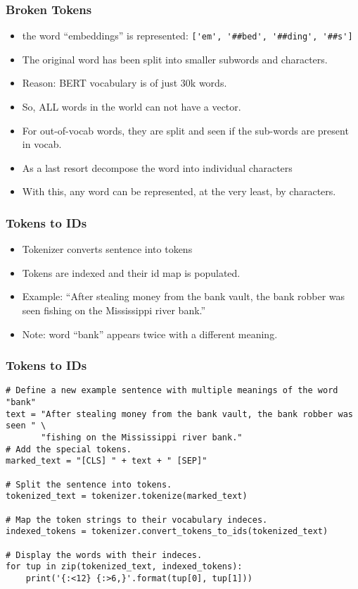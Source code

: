 \begin{frame}[fragile]\frametitle{Broken Tokens}
\begin{itemize}
\item the word ``embeddings'' is represented: \lstinline|['em', '##bed', '##ding', '##s']|
\item The original word has been split into smaller subwords and characters.
\item Reason: BERT vocabulary is of just 30k words.
\item So, ALL words in the world can not have a vector.
\item For out-of-vocab words, they are split and seen if the sub-words are present in vocab.
\item As a last resort decompose the word into individual characters
\item With this, any word can be represented, at the very least, by characters.
\end{itemize}

\end{frame}


\begin{frame}[fragile]\frametitle{Tokens to IDs}
\begin{itemize}
\item Tokenizer converts sentence into tokens
\item Tokens are indexed and their id map is populated.
\item Example: ``After stealing money from the bank vault, the bank robber was seen fishing on the Mississippi river bank.''
\item Note: word ``bank'' appears twice with a different meaning.
\end{itemize}

\end{frame}

\begin{frame}[fragile]\frametitle{Tokens to IDs}

\begin{lstlisting}
# Define a new example sentence with multiple meanings of the word "bank"
text = "After stealing money from the bank vault, the bank robber was seen " \
       "fishing on the Mississippi river bank."
# Add the special tokens.
marked_text = "[CLS] " + text + " [SEP]"

# Split the sentence into tokens.
tokenized_text = tokenizer.tokenize(marked_text)

# Map the token strings to their vocabulary indeces.
indexed_tokens = tokenizer.convert_tokens_to_ids(tokenized_text)

# Display the words with their indeces.
for tup in zip(tokenized_text, indexed_tokens):
    print('{:<12} {:>6,}'.format(tup[0], tup[1]))

\end{lstlisting}

\end{frame}

